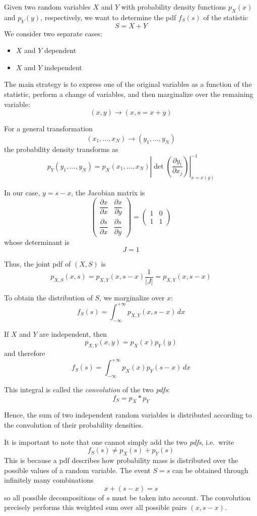 \begin{exercise}\label{exer:variable_sum}
	Given two random variables $X$ and $Y$ with probability density functions
	$p_X(x)$ and $p_Y(y)$, respectively, we want to determine the pdf
	$f_S(s)$ of the statistic
	\[
	S = X + Y
	\]
	We consider two separate cases:
	\begin{itemize}
		\item $X$ and $Y$ dependent
		\item $X$ and $Y$ independent
	\end{itemize}
	
	The main strategy is to express one of the original variables as a function
	of the statistic, perform a change of variables, and then marginalize over
	the remaining variable:
	\[
	(x,y)\longrightarrow (x,s=x+y)
	\]
	
	For a general transformation
	\[
	(x_1,\dots,x_N)\longrightarrow(y_1,\dots,y_N)
	\]
	the probability density transforms as
	\[
	p_Y(y_1,\dots,y_N)
	=
	p_X(x_1,\dots,x_N)
	\left|
	\det\!\left(
	\frac{\partial y_i}{\partial x_j}
	\right)
	\right|^{-1}_{x=x(y)}
	\]
	
	In our case, $y=s-x$, the Jacobian matrix is
	\[
	\begin{pmatrix}
		\dfrac{\partial x}{\partial x} &
		\dfrac{\partial x}{\partial y}
		\\[1em]
		\dfrac{\partial s}{\partial x} &
		\dfrac{\partial s}{\partial y}
	\end{pmatrix}
	=
	\begin{pmatrix}
		1 & 0\\
		1 & 1
	\end{pmatrix}
	\]
	whose determinant is
	\[
	J = 1
	\]
	
	Thus, the joint pdf of $(X,S)$ is
	\[
	p_{X,S}(x,s)
	=
	p_{X,Y}(x,s-x)\frac{1}{|J|}
	=
	p_{X,Y}(x,s-x)
	\]
	
	To obtain the distribution of $S$, we marginalize over $x$:
	\[
	f_S(s)
	=
	\int_{-\infty}^{+\infty}
	p_{X,Y}(x,s-x)\,dx
	\]
	
	If $X$ and $Y$ are independent, then
	\[
	p_{X,Y}(x,y)=p_X(x)p_Y(y)
	\]
	and therefore
	\[
	f_S(s)
	=
	\int_{-\infty}^{+\infty}
	p_X(x)p_Y(s-x)\,dx
	\]
	
	This integral is called the \emph{convolution} of the two \emph{pdfs}:
	\[
	f_S = p_X * p_Y
	\]
	
	Hence, the sum of two independent random variables is distributed
	according to the convolution of their probability densities.
	
	It is important to note that one cannot simply add the two \emph{pdfs},
	i.e.\ write
	\[
	f_S(s)\neq p_X(s)+p_Y(s)
	\]
	This is because a pdf describes how probability mass is distributed
	over the possible values of a random variable. The event
	$S=s$ can be obtained through infinitely many combinations
	\[
	x+(s-x)=s
	\]
	so all possible decompositions of $s$ must be taken into account.
	The convolution precisely performs this weighted sum over all
	possible pairs $(x,s-x)$.
	

\end{exercise}
